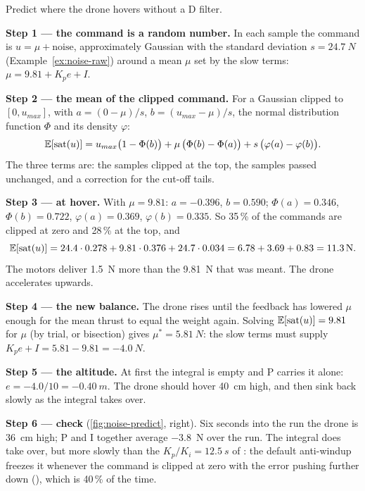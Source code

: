 \begin{example}
\label{ex:noise-rect}
Predict where the drone hovers without a D filter.

\textbf{Step 1 — the command is a random number.} In each sample the command is $u = \mu + \text{noise}$, approximately Gaussian with the standard deviation $s = \SI{24.7}{N}$ (Example~\ref{ex:noise-raw}) around a mean $\mu$ set by the slow terms: $\mu = 9.81 + K_p e + I$.

\textbf{Step 2 — the mean of the clipped command.} For a Gaussian clipped to $[0, u_{max}]$, with $a = (0 - \mu)/s$, $b = (u_{max} - \mu)/s$, the normal distribution function $\Phi$ and its density $\varphi$:
\begin{equation*}
  \mathbb{E}[\operatorname{sat}(u)] = u_{max}\big(1 - \Phi(b)\big) + \mu\,\big(\Phi(b) - \Phi(a)\big) + s\,\big(\varphi(a) - \varphi(b)\big).
\end{equation*}
The three terms are: the samples clipped at the top, the samples passed unchanged, and a correction for the cut-off tails.

\textbf{Step 3 — at hover.} With $\mu = 9.81$: $a = -0.396$, $b = 0.590$; $\Phi(a) = 0.346$, $\Phi(b) = 0.722$, $\varphi(a) = 0.369$, $\varphi(b) = 0.335$. So 35\,\% of the commands are clipped at zero and 28\,\% at the top, and
\begin{equation*}
  \mathbb{E}[\operatorname{sat}(u)] = 24.4 \cdot 0.278 + 9.81 \cdot 0.376 + 24.7 \cdot 0.034 = 6.78 + 3.69 + 0.83 = \SI{11.3}{N}.
\end{equation*}
The motors deliver \SI{1.5}{N} more than the \SI{9.81}{N} that was meant. The drone accelerates upwards.

\textbf{Step 4 — the new balance.} The drone rises until the feedback has lowered $\mu$ enough for the mean thrust to equal the weight again. Solving $\mathbb{E}[\operatorname{sat}(u)] = 9.81$ for $\mu$ (by trial, or bisection) gives $\mu^* = \SI{5.81}{N}$: the slow terms must supply $K_p e + I = 5.81 - 9.81 = \SI{-4.0}{N}$.

\textbf{Step 5 — the altitude.} At first the integral is empty and P carries it alone: $e = -4.0/10 = \SI{-0.40}{m}$. The drone should hover \SI{40}{cm} high, and then sink back slowly as the integral takes over.

\textbf{Step 6 — check} (\cref{fig:noise-predict}, right). Six seconds into the run the drone is \SI{36}{cm} high; P and I together average \SI{-3.8}{N} over the run. The integral does take over, but more slowly than the $K_p/K_i = \SI{12.5}{s}$ of : the default anti-windup freezes it whenever the command is clipped at zero with the error pushing further down (), which is 40\,\% of the time.
\end{example}

